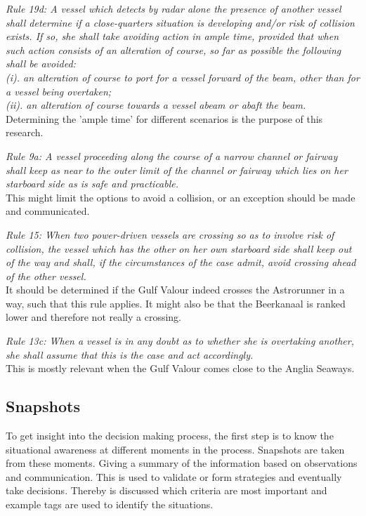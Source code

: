 \emph{Rule 19d: A vessel which detects by radar alone the presence of another vessel shall determine if a close-quarters situation is developing and/or risk of collision exists. If so, she shall take avoiding action in ample time, provided that when such action consists of an alteration of course, so far as possible the following shall be avoided:\\
	(i). an alteration of course to port for a vessel forward of the beam, other than for a vessel being overtaken;\\
	(ii). an alteration of course towards a vessel abeam or abaft the beam.}\\
Determining the 'ample time' for different scenarios is the purpose of this research.

\emph{Rule 9a: A vessel proceeding along the course of a narrow channel or fairway shall keep as near to the outer limit of the channel or fairway which lies on her starboard side as is safe and practicable.}\\
This might limit the options to avoid a collision, or an exception should be made and communicated.

\emph{Rule 15: When two power-driven vessels are crossing so as to involve risk of collision, the vessel which has the other on her own starboard side shall keep out of the way and shall, if the circumstances of the case admit, avoid crossing ahead of the other vessel.}\\
It should be determined if the Gulf Valour indeed crosses the Astrorunner in a way, such that this rule applies.
It might also be that the Beerkanaal is ranked lower and therefore not really a crossing.

\emph{Rule 13c: When a vessel is in any doubt as to whether she is overtaking another, she shall assume that this is the case and act accordingly.}\\
This is mostly relevant when the Gulf Valour comes close to the Anglia Seaways.

\subsection{Snapshots}
To get insight into the decision making process, the first step is to know the situational awareness at different moments in the process. Snapshots are taken from these moments. Giving a summary of the information based on observations and communication.
This is used to validate or form strategies and eventually take decisions. Thereby is discussed which criteria are most important and example tags are used to identify the situations.

